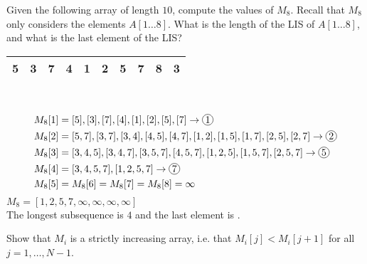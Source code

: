 \documentclass[11pt]{article}
\newcommand{\circled}[2]{%
    \tikz[baseline=(char.base)]{\node[draw, circle, inner sep=1pt] (char) {#1};}%
    }
\begin{document}
\begin{subparts}
    \subpart Given the following array of length $10$, compute the values of $M_8$. Recall that $M_8$ only considers the elements $A[1\dots 8]$. What is the length of the LIS of $A[1\dots 8]$, and what is the last element of the LIS?
    \begin{table}[htbp]
        \centering
        \begin{tabular}{|c|c|c|c|c|c|c|c|c|c|}
            \hline
            5 & 3 & 7 & 4 & 1 & 2 & 5 & 7 & 8 & 3 \\
            \hline
        \end{tabular}
    \end{table}\\
    \begin{solution}
        \begin{align*}
            M_8[1] &= [5], [3], [7], [4], [1], [2], [5], [7] \rightarrow \circled{1}{}\\
            M_8[2] &= [5, 7], [3, 7], [3, 4], [4, 5], [4, 7], [1, 2], [1, 5], [1, 7], [2, 5], [2, 7] \rightarrow \circled{2}{}\\
            M_8[3] &= [3, 4, 5], [3, 4, 7], [3, 5, 7], [4, 5, 7], [1, 2, 5], [1, 5, 7], [2, 5, 7] \rightarrow \circled{5}{}\\
            M_8[4] &= [3, 4, 5, 7], [1, 2, 5, 7] \rightarrow \circled{7}{}\\
            M_8[5] &= M_8[6] = M_8[7] = M_8[8] = \infty
        \end{align*}
        $M_8 = [1, 2, 5, 7, \infty, \infty, \infty, \infty]$\\
        The longest subsequence is $4$ and the last element is \circled{7}{}.
    \end{solution}
    \subpart Show that $M_i$ is a strictly increasing array, i.e. that $M_i[j] < M_i[j+1]$ for all $j = 1, \dots, N - 1$.


\end{subparts}
\end{document}
